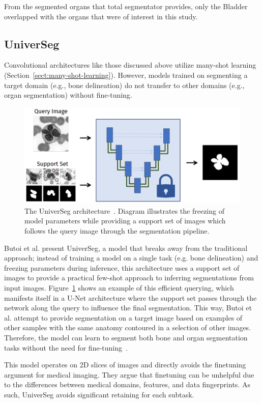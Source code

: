 \documentclass[12pt,twoside]{report}
\begin{document}
From the segmented organs that total segmentator provides, only the Bladder overlapped with the organs that were of interest in this study.

\subsection{UniverSeg}\label{sect:universeg}

Convolutional architectures like those discussed above utilize many-shot learning (Section~\ref{sect:many-shot-learning}). However, models trained on segmenting a target domain (e.g., bone delineation) do not transfer to other domains (e.g., organ segmentation) without fine-tuning.

\begin{figure}[H]
  \centering
  \includegraphics[width=.5\linewidth]{../figures/universeg.png}
  \caption{The UniverSeg architecture~\cite{universeg}. Diagram illustrates the freezing of model parameters while providing a support set of images which follows the query image through the segmentation pipeline.}\label{fig:universeg}
\end{figure}

Butoi et al. present UniverSeg, a model that breaks away from the traditional approach; instead of training a model on a single task (e.g. bone delineation) and freezing parameters during inference, this architecture uses a support set of images to provide a practical few-shot approach to inferring segmentations from input images. Figure~\ref{fig:universeg} shows an example of this efficient querying, which manifests itself in a U-Net architecture where the support set passes through the network along the query to influence the final segmentation. This way, Butoi et al. attempt to provide segmentation on a target image based on examples of other samples with the same anatomy contoured in a selection of other images. Therefore, the model can learn to segment both bone and organ segmentation tasks without the need for fine-tuning~\cite{universeg}.

This model operates on 2D slices of images and directly avoids the finetuning argument for medical imaging. They argue that finetuning can be unhelpful due to the differences between medical domains, features, and data fingerprints. As such, UniverSeg avoids significant retaining for each subtask.
\end{document}
